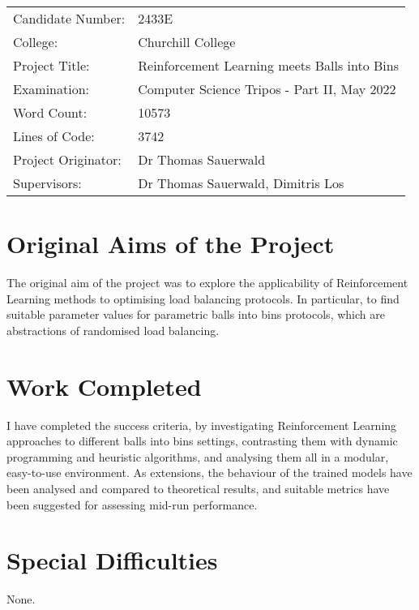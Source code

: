 
\begin{proforma}      


\begin{table}[h]
\begin{tabular}{ll}
Candidate Number:  & 2433E \\
College: & Churchill College \\
Project Title:    &  Reinforcement Learning meets Balls into Bins  \\
Examination:  & Computer Science Tripos - Part II, May 2022   \\
Word Count:  & 10573 \\
Lines of Code: & 3742 \\
Project Originator: & Dr Thomas Sauerwald \\
Supervisors: & Dr Thomas Sauerwald, Dimitris Los 
\end{tabular}
\end{table}


\section*{Original Aims of the Project}

The original aim of the project was to explore the applicability of Reinforcement Learning methods to optimising load balancing protocols. In particular, to find suitable parameter values for parametric balls into bins protocols, which are abstractions of randomised load balancing.

\section*{Work Completed}

I have completed the success criteria, by investigating Reinforcement Learning approaches to different balls into bins settings, contrasting them with dynamic programming and heuristic algorithms, and analysing them all in a modular, easy-to-use environment. As extensions, the behaviour of the trained models have been analysed and compared to theoretical results, and suitable metrics have been suggested for assessing mid-run performance.

\section*{Special Difficulties}

None.

\end{proforma}
